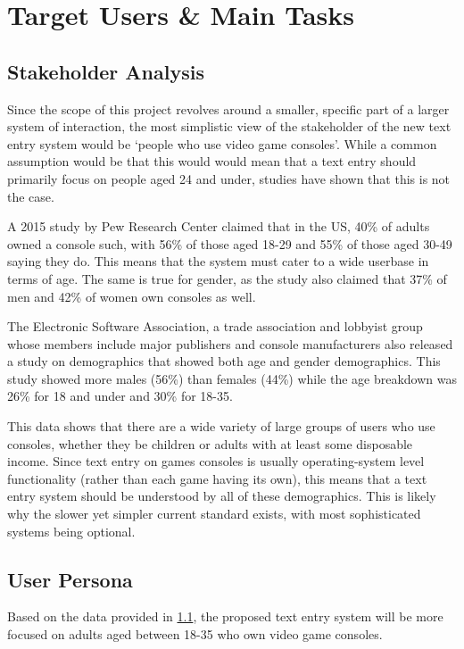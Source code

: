 \documentclass[requirements.tex]{subfiles}
\begin{document}
\section{Target Users \& Main Tasks} %
\label{sec:target_users_main_tasks}

\subsection{Stakeholder Analysis} %
\label{sub:stakeholder_analysis}
Since the scope of this project revolves around a smaller, specific part of a
larger system of interaction, the most simplistic view of the stakeholder of the
new text entry system would be `people who use video game consoles'. While a
common assumption would be that this would would mean that a text entry should
primarily focus on people aged 24 and under, studies have shown that this is
not the case. 

A 2015 study by Pew Research Center \cite{pew} claimed that in the US, 40\% of
adults owned a console such, with 56\% of those aged 18-29 and 55\% of those
aged 30-49 saying they do. This means that the system must cater to a wide
userbase in terms of age. The same is true for gender, as the study also claimed
that 37\% of men and 42\% of women own consoles as well.

The Electronic Software Association, a trade association and lobbyist group
whose members include major publishers and console manufacturers also released a
study \cite{esa} on demographics that showed both age and gender demographics.
This study showed more males (56\%) than females (44\%) while the age breakdown
was 26\% for 18 and under and 30\% for 18-35.

This data shows that there are a wide variety of large groups of users who use
consoles, whether they be children or adults with at least some disposable
income. Since text entry on games consoles is usually operating-system level
functionality (rather than each game having its own), this means that a text
entry system should be understood by all of these demographics. This is likely
why the slower yet simpler current standard exists, with most sophisticated
systems being optional.

\subsection{User Persona} %
\label{sub:user_persona}
Based on the data provided in \ref{sub:stakeholder_analysis}, the proposed text
entry system will be more focused on adults aged between 18-35 who own video
game consoles.
\end{document}
